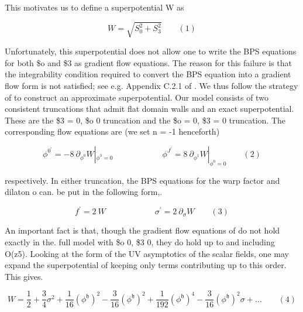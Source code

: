 \documentclass{article}
\begin{document}
\sloppy

This motivates us to define a superpotential W as


\begin{equation}
W = \sqrt { S _ { 0 } ^ { 2 } + S _ { 3 } ^ { 2 } } \qquad ( 1 )
\end{equation}


Unfortunately, this superpotential does not allow one to write the BPS equations for both
\$o and \$3 as gradient flow equations. The reason for this failure is that the integrability
condition required to convert the BPS equation into a gradient flow form is not satisfied;
see e.g. Appendix C.2.1 of . We thus follow the strategy of to construct an approximate
superpotential. Our model consists of two consistent truncations that admit flat domain walls
and an exact superpotential. These are the \$3 = 0, \$o  0 truncation and the \$o = 0, \$3 = 0
truncation. The corresponding flow equations are (we set n = -1 henceforth)


\begin{equation}
\phi ^ { 0 ^ { \prime } } = - 8 ~ \partial _ { \phi ^ { 0 } } W | _ { \phi ^ { 3 } = 0 } \qquad \qquad \qquad \phi ^ { J ^ { \prime } } = 8 ~ \partial _ { \phi ^ { 1 } } W | _ { \phi ^ { 0 } = 0 } \qquad ( 2 )
\end{equation}


respectively. In either truncation, the BPS equations for the warp factor and dilaton o can.
be put in the following form,.


\begin{equation}
f ^ { \prime } = 2 ~ W \qquad \qquad \qquad \sigma ^ { \prime } = 2 ~ \partial _ { \sigma } W \qquad ( 3 )
\end{equation}


An important fact is that, though the gradient flow equations of do not hold exactly in the.
full model with \$o  0, \$3  0, they do hold up to and including O(z5). Looking at the form
of the UV asymptotics of the scalar fields, one may expand the superpotential of keeping
only terms contributing up to this order. This gives.


\begin{equation}
W = { \frac { 1 } { 2 } } + { \frac { 3 } { 4 } } \sigma ^ { 2 } + { \frac { 1 } { 1 6 } } ( \phi ^ { \mathfrak { h } } ) ^ { 2 } - { \frac { 3 } { 1 6 } } ( \phi ^ { \mathfrak { h } } ) ^ { 2 } + { \frac { 1 } { 1 9 2 } } ( \phi ^ { \mathfrak { h } } ) ^ { 4 } - { \frac { 3 } { 1 6 } } ( \phi ^ { \mathfrak { h } } ) ^ { 2 } \sigma + \dots \qquad ( 4 )
\end{equation}
\end{document}
